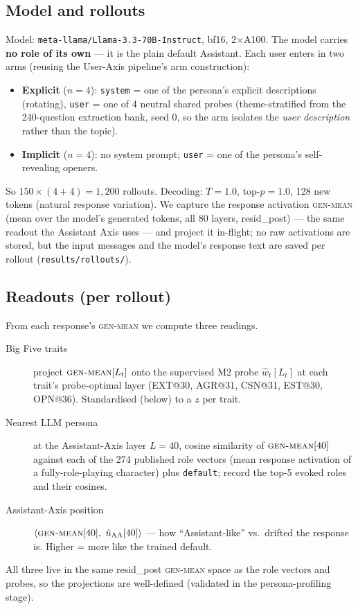 \documentclass[11pt]{article}
\newcommand{\gm}{\textsc{gen-mean}}
\begin{document}
\subsection{Model and rollouts}
Model: \texttt{meta-llama/Llama-3.3-70B-Instruct}, bf16, 2$\times$A100. The model
carries \textbf{no role of its own} --- it is the plain default Assistant. Each
user enters in two arms (reusing the User-Axis pipeline's arm construction):
\begin{itemize}
  \item \textbf{Explicit} ($n{=}4$): \texttt{system} = one of the persona's
        explicit descriptions (rotating), \texttt{user} = one of 4 neutral shared
        probes (theme-stratified from the 240-question extraction bank, seed 0, so
        the arm isolates the \emph{user description} rather than the topic).
  \item \textbf{Implicit} ($n{=}4$): no system prompt; \texttt{user} = one of the
        persona's self-revealing openers.
\end{itemize}
So $150 \times (4+4) = 1{,}200$ rollouts. Decoding: $T{=}1.0$, top-$p{=}1.0$,
128 new tokens (natural response variation). We capture the response activation
\gm{} (mean over the model's generated tokens, all 80 layers, resid\_post) --- the
same readout the Assistant Axis uses --- and project it in-flight; no raw
activations are stored, but the input messages and the model's response text are
saved per rollout (\texttt{results/rollouts/}).

\subsection{Readouts (per rollout)}
From each response's \gm{} we compute three readings.
\begin{description}
  \item[Big Five traits] project $\gm[L_t]$ onto the supervised M2 probe
    $\hat w_t[L_t]$ at each trait's probe-optimal layer (EXT@30, AGR@31, CSN@31,
    EST@30, OPN@36). Standardised (below) to a $z$ per trait.
  \item[Nearest LLM persona] at the Assistant-Axis layer $L{=}40$, cosine
    similarity of $\gm[40]$ against each of the 274 published role vectors (mean
    response activation of a fully-role-playing character) plus \texttt{default};
    record the top-5 evoked roles and their cosines.
  \item[Assistant-Axis position] $\langle \gm[40],\ \hat u_{\mathrm{AA}}[40]\rangle$
    --- how ``Assistant-like'' vs.\ drifted the response is. Higher = more like
    the trained default.
\end{description}
All three live in the same resid\_post \gm{} space as the role vectors and probes,
so the projections are well-defined (validated in the persona-profiling stage).
\end{document}

